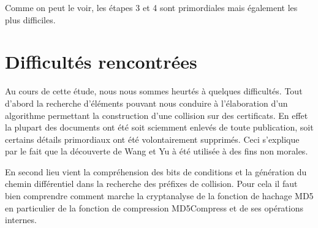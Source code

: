 Comme on peut le voir, les étapes 3 et 4 sont primordiales mais également les plus difficiles.


\section{Difficultés rencontrées}
Au cours de cette étude, nous nous sommes heurtés à quelques difficultés. Tout d'abord la recherche d'éléments pouvant nous conduire à l'élaboration d'un algorithme permettant la construction d'une collision sur des certificats. En effet la plupart des documents ont été soit sciemment enlevés de toute publication, soit certains détails primordiaux ont été volontairement supprimés. Ceci s'explique par le fait que la découverte de Wang et Yu à été utilisée à des fins non morales.

En second lieu vient la compréhension des bits de conditions et la génération du chemin différentiel dans la recherche des préfixes de collision. Pour cela il faut bien comprendre comment marche la cryptanalyse de la fonction de hachage MD5 en particulier de la fonction de compression MD5Compress et de ses opérations internes.

\newpage
